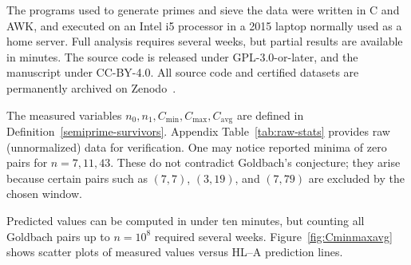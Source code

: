 \documentclass[11pt]{article}
\theoremstyle{inline}
\theoremstyle{break}
\theoremstyle{break}
\theoremstyle{break}
\theoremstyle{break}
\theoremstyle{break}
\theoremstyle{break}
\theoremstyle{break}
\theoremstyle{inline}
\newcommand{\tavg}{{\scriptscriptstyle\mathrm{avg}}}
\newcommand{\Cmeas}{C}              %
\newcommand{\Nmeas}{n}              %
\begin{document}
The programs used to generate primes and sieve the data were written in C and AWK, and executed on an Intel i5 processor in a 2015 laptop normally used as a home server.  Full analysis requires several weeks, but partial results are available in minutes.  The source code is released under GPL-3.0-or-later, and the manuscript under CC-BY-4.0.  All source code and certified datasets are permanently archived on Zenodo~\cite{Riemers2025SieveGoldbach}.

The measured variables \( \Nmeas_0, \Nmeas_1, \Cmeas_{\min}, \Cmeas_{\max}, \Cmeas_{\tavg} \) are defined in Definition~\ref{semiprime-survivors}. Appendix Table~\ref{tab:raw-stats} provides raw (unnormalized) data for verification. One may notice reported minima of zero pairs for \( n=7,11,43 \). These do not contradict Goldbach’s conjecture; they arise because certain pairs such as \( (7,7) \), \( (3,19) \), and \( (7,79) \) are excluded by the chosen window.

Predicted values can be computed in under ten minutes, but counting all Goldbach pairs up to \( n=10^8 \) required several weeks. Figure~\ref{fig:Cminmaxavg} shows scatter plots of measured values versus HL–A prediction lines.

\pairdata
\end{document}
